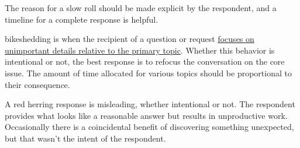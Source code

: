 The reason for a slow roll should be made explicit by the respondent, 
and a timeline for a complete response is helpful. 


\Gls{bikeshedding} is when the recipient of a question or request \href{https://en.wikipedia.org/wiki/Law_of_triviality}{focuses on unimportant details relative to the primary topic}. 
Whether this behavior is intentional or not, the best response is to refocus the conversation on the core issue. The amount of time allocated for various topics should be proportional to their consequence. 

A \gls{red herring} response is misleading, whether intentional or not. The respondent provides what looks like a reasonable answer but results in unproductive work. Occasionally there is a coincidental benefit of discovering something unexpected, but that wasn't the intent of the respondent. 


